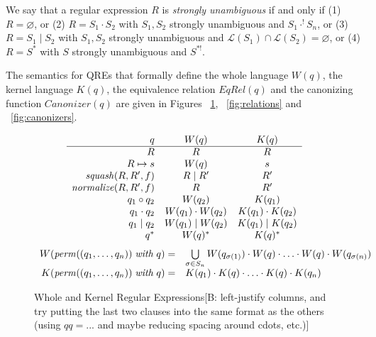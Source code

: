 \documentclass{svproc}
\newcommand{\FINISH}[3]{\ifdraft\textcolor{#1}{[#2: #3]}\fi}
\newcommand{\bcp}[1]{\FINISH{dkred}{B}{#1}}
\newcommand{\squash}[3]{\ensuremath{\mathit{squash}(#1, #2, #3)}}
\newcommand{\perm}[2]{\ensuremath{\mathit{perm}(#1)\; \mathit{with}\; #2}}
\newcommand{\normalize}[3]{\ensuremath{\mathit{normalize}(#1, #2, #3)}}
\newcommand{\sep}{\ensuremath{\; | \;}}
\begin{document}
We say that a regular expression $R$ is \textit{strongly unambiguous} if and
only if (1) $R = \varnothing$, or (2) $R = S_1 \cdot S_2$ with $S_1, S_2$
strongly unambiguous and $S_1 \cdot^! S_n$, or (3) $R = S_1 \sep S_2$ with
$S_1, S_2$ strongly unambiguous and $\mathcal{L}(S_1) \cap \mathcal{L}(S_2) =
\varnothing$, or (4) $R = S^*$ with $S$ strongly unambiguous and $S^{*!}$.

The semantics for QREs that formally define the whole language $W(q)$, the
kernel language $K(q)$, the equivalence relation $EqRel(q)$ and the
canonizing function $Canonizer(q)$ are given in Figures ~\ref{fig:wk},
~\ref{fig:relations} and ~\ref{fig:canonizers}.
\begin{figure}[t]
  \centering
  \[
    \begin{array}{r@{\quad}c@{\quad}cc}
   
      q & W(q) & K(q) \\ \hline
      R & R & R \\
      R \mapsto s & W(q) & s \\
      \squash{R}{R'}{f} & R \sep R' & R' \\
      \normalize{R}{R'}{f} & R & R' \\
      q_1 \circ  q_2 & W(q_2) & K(q_1) \\
      q_1 \cdot q_2 & W(q_1) \cdot W(q_2) & K(q_1) \cdot K(q_2) \\
      q_1 \sep q_2 & W(q_1) \sep W(q_2) & K(q_1) \sep K(q_2) \\
      q^* & W(q)^* & K(q)^* \\
    \end{array}
  \]
\[
\begin{array}{r@{\quad}l}
W( \perm{(q_1, \ldots, q_n)}{q} ) = &
\bigcup \limits_{\sigma \in S_n} W(q_{\sigma(1)}) \cdot W(q) \cdot \ldots \cdot W(q) \cdot W(q_{\sigma(n)})
\\
K( \perm{(q_1, \ldots, q_n)}{q} ) = &
 K(q_1) \cdot K(q) \cdot \ldots \cdot K(q) \cdot K(q_n) 
\end{array}
\]
  \caption{Whole and Kernel Regular Expressions\bcp{left-justify columns,
      and try putting the last two clauses into the same format as the
      others (using $\mathit{qq} = ...$ and maybe reducing spacing around
      cdots, etc.)}}
  \label{fig:wk}
\end{figure}
\end{document}
